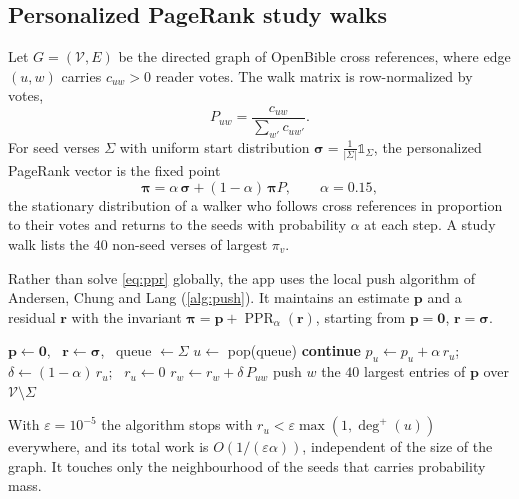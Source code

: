 \documentclass[11pt]{article}
\newcommand{\code}[1]{\texttt{#1}}
\begin{document}
\subsection{Personalized PageRank study walks}

Let $G = (\mathcal{V}, E)$ be the directed graph of OpenBible cross references,
where edge $(u, w)$ carries $c_{uw} > 0$ reader votes. The walk matrix is
row-normalized by votes,
\begin{equation}
  P_{uw} = \frac{c_{uw}}{\sum_{w'} c_{uw'}}.
\end{equation}
For seed verses $\Sigma$ with uniform start distribution
$\bm{\sigma} = \frac{1}{|\Sigma|}\mathbb{1}_\Sigma$, the personalized PageRank
vector is the fixed point
\begin{equation}\label{eq:ppr}
  \bm{\pi} = \alpha\,\bm{\sigma} + (1 - \alpha)\,\bm{\pi} P, \qquad \alpha = 0.15,
\end{equation}
the stationary distribution of a walker who follows cross references in
proportion to their votes and returns to the seeds with probability $\alpha$ at
each step. A study walk lists the $40$ non-seed verses of largest $\pi_v$.

Rather than solve \cref{eq:ppr} globally, the app uses the local push algorithm
of Andersen, Chung and Lang \cite{acl} (\cref{alg:push}). It maintains an
estimate $\bm{p}$ and a residual $\bm{r}$ with the invariant
$\bm{\pi} = \bm{p} + \operatorname{PPR}_\alpha(\bm{r})$, starting from
$\bm{p} = \bm{0}$, $\bm{r} = \bm{\sigma}$.

\begin{algorithm}[htbp]
\caption{Push approximation of personalized PageRank, as in \code{studyWalk}}
\label{alg:push}
\begin{algorithmic}[1]
\State $\bm{p} \gets \bm{0}$, \ $\bm{r} \gets \bm\sigma$, \ queue $\gets \Sigma$
  \State $u \gets$ pop(queue)
   \textbf{continue} \EndIf
  \State $p_u \gets p_u + \alpha\, r_u$; \ $\delta \gets (1-\alpha)\, r_u$; \ $r_u \gets 0$
    \State $r_w \gets r_w + \delta\, P_{uw}$
     push $w$ \EndIf
  \EndFor
\EndWhile
\State \Return the $40$ largest entries of $\bm{p}$ over $\mathcal{V} \setminus \Sigma$
\end{algorithmic}
\end{algorithm}

With $\varepsilon = 10^{-5}$ the algorithm stops with
$r_u < \varepsilon \max(1, \deg^+(u))$ everywhere, and its total work is
$O\!\left(1/(\varepsilon\alpha)\right)$, independent of the size of the graph.
It touches only the neighbourhood of the seeds that carries probability mass.
\end{document}
